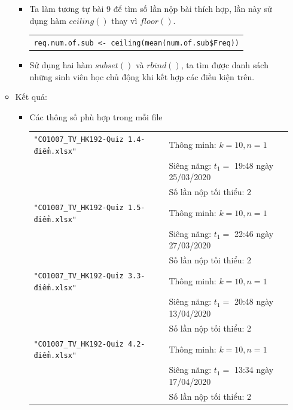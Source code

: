\documentclass[a4paper]{article}
\theoremstyle{definition}
\begin{document}
\begin{enumerate}[a)]
\begin{itemize}
\begin{itemize}
\begin{center}
\begin{tabular}{p{13cm}}
                \end{tabular}
            \end{center}
            \item Ta làm tương tự bài 9 để tìm số lần nộp bài thích hợp, lần này sử dụng hàm $ceiling()$ thay vì $floor()$.
            \begin{center}
                \begin{tabular}{p{13cm}}
                    \texttt{req.num.of.sub <- ceiling(mean(num.of.sub\$Freq))}
                \end{tabular}
            \end{center}
            \item Sử dụng hai hàm $subset()$ và $rbind()$, ta tìm được danh sách những sinh viên học chủ động khi kết hợp các điều kiện trên.
        \end{itemize}
        \item Kết quả:
        \begin{itemize}
            \item Các thông số phù hợp trong mỗi file
            \begin{center}
                \begin{tabular}{l l}
                     \texttt{"CO1007\_TV\_HK192-Quiz 1.4-điểm.xlsx"} & Thông minh: $k = 10, n = 1$\\ 
                     & Siêng năng: $t_1 =$ 19:48 ngày 25/03/2020\\
                     & Số lần nộp tối thiểu: 2\\
                     \texttt{"CO1007\_TV\_HK192-Quiz 1.5-điểm.xlsx"} & Thông minh: $k = 10, n = 1$\\ 
                     & Siêng năng: $t_1 =$ 22:46 ngày 27/03/2020\\
                     & Số lần nộp tối thiểu: 2\\
                     \texttt{"CO1007\_TV\_HK192-Quiz 3.3-điểm.xlsx"} & Thông minh: $k = 10, n = 1$\\ 
                     & Siêng năng: $t_1 =$ 20:48 ngày 13/04/2020\\
                     & Số lần nộp tối thiểu: 2\\
                     \texttt{"CO1007\_TV\_HK192-Quiz 4.2-điểm.xlsx"} & Thông minh: $k = 10, n = 1$\\ 
                     & Siêng năng: $t_1 =$ 13:34 ngày 17/04/2020\\
                     & Số lần nộp tối thiểu: 2\\

\end{tabular}
\end{center}
\end{itemize}
\end{itemize}
\end{enumerate}
\end{document}

